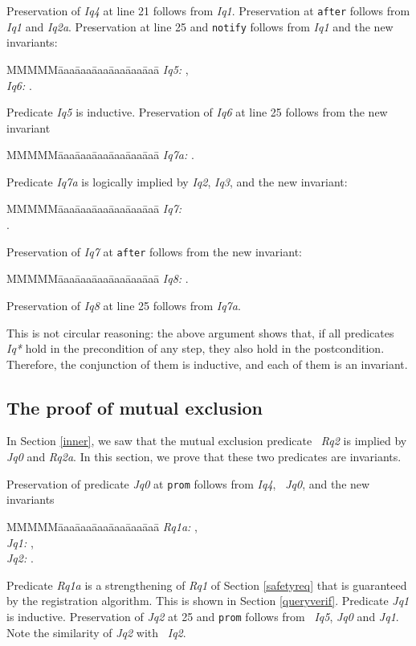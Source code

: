 \documentclass[10pt]{article} \usepackage[english]{babel}
\newenvironment{tab}{\begin{tabbing}
MMMMM\=aaa\=aaa\=aaa\=aaa\=aaa\=aaa\= \kill}{\end{tabbing}}
\def\S #1/{\mbox {\textsl{#1}}}
\def\T #1/{\mbox {\texttt{#1}}}
\begin{document}
Preservation of \S Iq4/ at line 21 follows from \S Iq1/.  Preservation
at \T after/ follows from \S Iq1/ and \S Iq2a/.  Preservation at line
25 and \T notify/ follows from \S Iq1/ and the new invariants:
\begin{tab}
\S Iq5:/ \>  ,\\
\S Iq6:/ \>  .
\end{tab}
Predicate \S Iq5/ is inductive.  Preservation of \S Iq6/ at line 25
follows from the new invariant
\begin{tab}
\S Iq7a:/ \>  .
\end{tab}
Predicate \S Iq7a/ is logically implied by \S Iq2/, \S Iq3/, and the new
invariant:
\begin{tab}
\S Iq7:/ \> \\
\>  .
\end{tab}
Preservation of \S Iq7/ at \T after/ follows from the new invariant:
\begin{tab}
\S Iq8:/ \>  .
\end{tab}
Preservation of \S Iq8/ at line 25 follows from \S Iq7a/. 

This is not circular reasoning: the above argument shows that, if all
predicates \S Iq*/ hold in the precondition of any step, they also
hold in the postcondition. Therefore, the conjunction of them is
inductive, and each of them is an invariant.

\subsection{The proof of mutual exclusion} \label{mx_proof}

In Section \ref{inner}, we saw that the mutual exclusion predicate \S
Rq2/ is implied by \S Jq0/ and \S Rq2a/.  In this section, we prove
that these two predicates are invariants.

Preservation of predicate \S Jq0/ at \T prom/ follows from \S Iq4/, \S
Jq0/, and the new invariants
\begin{tab}
  \S Rq1a:/ \>  ,\\
  \S Jq1:/ \>  ,\\
  \S Jq2:/ \>  .
\end{tab}
Predicate \S Rq1a/ is a strengthening of \S Rq1/ of Section
\ref{safetyreq} that is guaranteed by the registration algorithm.
This is shown in Section \ref{queryverif}.  Predicate \S Jq1/ is
inductive.  Preservation of \S Jq2/ at 25 and \T prom/ follows from \S
Iq5/, \S Jq0/ and \S Jq1/.  Note the similarity of \S Jq2/ with \S
Iq2/.
\end{document}
